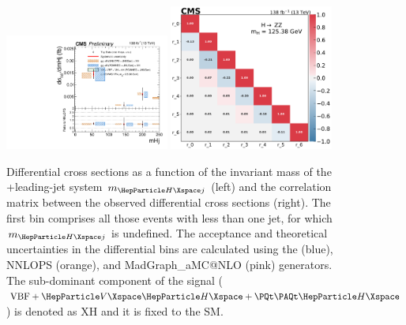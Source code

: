 \begin{center}
	\begin{figure}[!htb]
		\centering
		\includegraphics[width=0.48\textwidth]{Images/H4L/mHj_unfoldwith_SM_125_asimov.pdf}
		\includegraphics[width=0.48\textwidth]{Images/H4L/correlations/corr_mHj_v3.pdf}\\
		\caption{
			Differential cross sections as a function of the invariant mass of the \PH+leading-jet system $m_{\PH j}$ (left) and the correlation matrix between the observed differential cross sections (right).
			The first bin comprises all those events with less than one jet, for which $m_{\PH j}$  is undefined.
			The acceptance and theoretical uncertainties in the differential bins are calculated using the \POWHEG (blue), NNLOPS (orange), and MadGraph\_aMC@NLO (pink) generators.
			The sub-dominant component of the signal ($\VBF + \VH + \ttH$) is denoted as XH and it is fixed to the SM.
			\label{fig:fidMHJ}}
	\end{figure}
\end{center}

\clearpage

